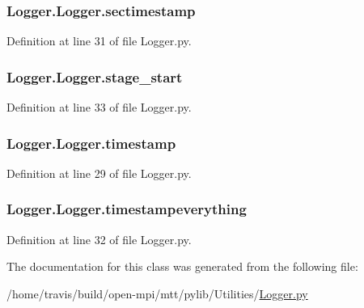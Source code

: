 \hypertarget{classLogger_1_1Logger_a9d1172c2a7abb0264b9e41368475ffe7}{
\subsubsection[{sectimestamp}]{\setlength{\rightskip}{0pt plus 5cm}Logger.\-Logger.\-sectimestamp}}\label{classLogger_1_1Logger_a9d1172c2a7abb0264b9e41368475ffe7}


Definition at line 31 of file Logger.\-py.

\hypertarget{classLogger_1_1Logger_a639adf5e0d4f73bdb942e9652903231f}{
\subsubsection[{stage\-\_\-start}]{\setlength{\rightskip}{0pt plus 5cm}Logger.\-Logger.\-stage\-\_\-start}}\label{classLogger_1_1Logger_a639adf5e0d4f73bdb942e9652903231f}


Definition at line 33 of file Logger.\-py.

\hypertarget{classLogger_1_1Logger_af1d68b73fec8eebd0abeafa3bc8fd98b}{
\subsubsection[{timestamp}]{\setlength{\rightskip}{0pt plus 5cm}Logger.\-Logger.\-timestamp}}\label{classLogger_1_1Logger_af1d68b73fec8eebd0abeafa3bc8fd98b}


Definition at line 29 of file Logger.\-py.

\hypertarget{classLogger_1_1Logger_a6012f50ab21e5ab3b89465a972b6a99d}{
\subsubsection[{timestampeverything}]{\setlength{\rightskip}{0pt plus 5cm}Logger.\-Logger.\-timestampeverything}}\label{classLogger_1_1Logger_a6012f50ab21e5ab3b89465a972b6a99d}


Definition at line 32 of file Logger.\-py.



The documentation for this class was generated from the following file\-:\begin{DoxyCompactItemize}
\item 
/home/travis/build/open-\/mpi/mtt/pylib/\-Utilities/\hyperlink{Logger_8py}{Logger.\-py}\end{DoxyCompactItemize}
